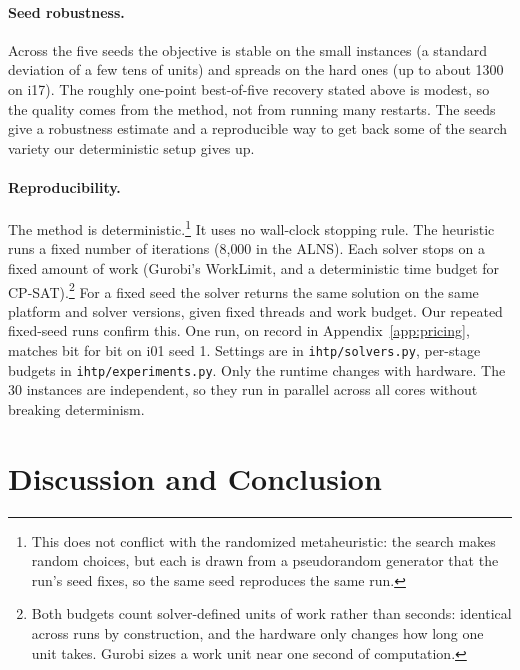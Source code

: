 \documentclass[11pt]{article}
\newcommand{\anote}[1]{\footnote{#1}}
\begin{document}
	\paragraph{Seed robustness.} Across the five seeds the objective is stable on the small instances
	(a standard deviation of a few tens of units) and spreads on the hard ones (up to about 1300 on i17). The
	roughly one-point best-of-five recovery stated above is modest, so the quality comes
	from the method, not from running many restarts. The seeds give a robustness estimate and a reproducible way to get back some of the search variety our deterministic setup gives up.

	\paragraph{Reproducibility.} The method is deterministic.\footnote{This does not conflict with the randomized metaheuristic: the search makes random choices, but each is drawn from a pseudorandom generator that the run's seed fixes, so the same seed reproduces the same run.} It uses no wall-clock stopping rule. The heuristic runs a fixed number of iterations (8{,}000 in the ALNS). Each solver stops on a fixed amount of work (Gurobi's WorkLimit, and a deterministic time budget for CP-SAT).\anote{Both budgets count solver-defined units of work rather than seconds: identical across runs by construction, and the hardware only changes how long one unit takes. Gurobi sizes a work unit near one second of computation.} For a fixed seed the solver returns the same solution on the same platform and solver versions, given fixed threads and work budget. Our repeated fixed-seed runs confirm this. One run, on record in Appendix~\ref{app:pricing}, matches bit for bit on i01 seed 1. Settings are in \texttt{ihtp/solvers.py}, per-stage budgets in \texttt{ihtp/experiments.py}. Only the runtime
	changes with hardware. The 30 instances are independent, so they run in parallel across all
	cores without breaking determinism.

	\section{Discussion and Conclusion}\label{sec:discussion}
\end{document}
